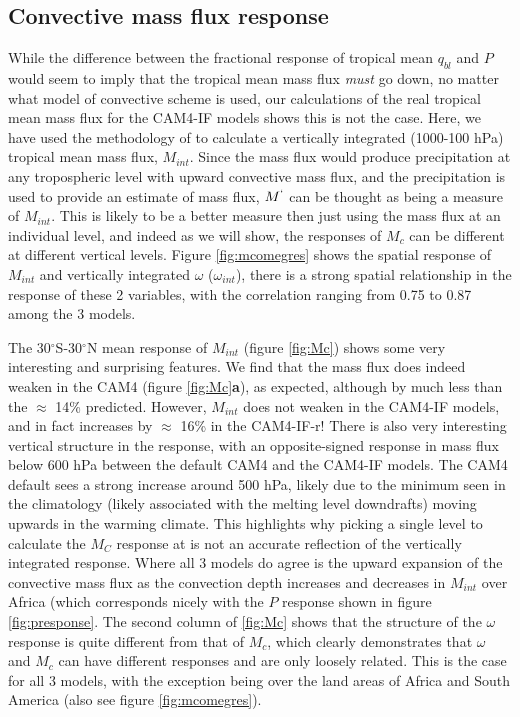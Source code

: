 \documentclass[letterpaper,12pt,titlepage,oneside,final]{book}
\begin{document}
\subsection{Convective mass flux response}
While the difference between the fractional response of tropical mean $q_{bl}$ and $P$ would seem to imply that the tropical mean mass flux \textit{must} go down, no matter what model of convective scheme is used, our calculations of the real tropical mean mass flux for the CAM4-IF models shows this is not the case. Here, we have used the methodology of \citep{chadwick_spatial_2012} to calculate a vertically integrated (1000-100 hPa) tropical mean mass flux, $M_{int}$. Since the mass flux would produce precipitation at any tropospheric level with upward convective mass flux, and the precipitation is used to provide an estimate of mass flux, $M^{`}$ can be thought as being a measure of $M_{int}$. This is likely to be a better measure then just using the mass flux at an individual level, and indeed as we will show, the responses of $M_{c}$ can be different at different vertical levels. Figure \ref{fig:mcomegres} shows the spatial response of $M_{int}$ and vertically integrated $\omega$ ($\omega_{int}$), there is a strong spatial relationship in the response of these 2 variables, with the correlation ranging from 0.75 to 0.87 among the 3 models.

The 30$^{\circ}$S-30$^{\circ}$N mean response of $M_{int}$ (figure \ref{fig:Mc}) shows some very interesting and surprising features. We find that the mass flux does indeed weaken in the CAM4 (figure \ref{fig:Mc}\textbf{a}), as expected, although by much less than the $\approx$ 14\% predicted. However, $M_{int}$ does not weaken in the CAM4-IF models, and in fact increases by $\approx$ 16\% in the CAM4-IF-r! There is also very interesting vertical structure in the response, with an opposite-signed response in mass flux below 600 hPa between the default CAM4 and the CAM4-IF models. The CAM4 default sees a strong increase around 500 hPa, likely due to the minimum seen in the climatology (likely associated with the melting level downdrafts) moving upwards in the warming climate. This highlights why picking a single level to calculate the $M_{C}$ response at is not an accurate reflection of the vertically integrated response. Where all 3 models do agree is the upward expansion of the convective mass flux as the convection depth increases and decreases in $M_{int}$ over Africa (which corresponds nicely with the $P$ response shown in figure \ref{fig:presponse}. The second column of \ref{fig:Mc} shows that the structure of the $\omega$ response is quite different from that of $M_{c}$, which clearly demonstrates that $\omega$ and $M_{c}$ can have different responses and are only loosely related. This is the case for all 3 models, with the exception being over the land areas of Africa and South America (also see figure \ref{fig:mcomegres}).
\end{document}
